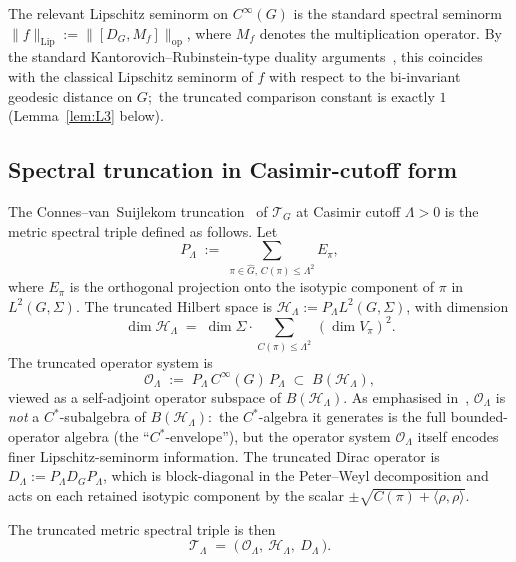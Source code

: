 \documentclass[11pt,a4paper]{article}
\theoremstyle{plain}
\theoremstyle{definition}
\newcommand{\Lammax}{\Lambda}
\newcommand{\Hilb}{\mathcal{H}}
\newcommand{\Op}{\mathcal{O}}
\newcommand{\Tcal}{\mathcal{T}}
\newcommand{\opnorm}[1]{\lVert #1 \rVert_{\mathrm{op}}}
\newcommand{\Lipnorm}[1]{\lVert #1 \rVert_{\mathrm{Lip}}}
\newcommand{\Cas}{C}
\newcommand{\Dop}{D}
\begin{document}
The relevant Lipschitz seminorm on $C^\infty(G)$ is the standard
spectral seminorm $\Lipnorm{f} := \opnorm{[\Dop_G, M_f]}$, where $M_f$
denotes the multiplication operator. By the standard
Kantorovich--Rubinstein-type duality
arguments~\cite{connes1995, latremoliere2018}, this coincides with the
classical Lipschitz seminorm of $f$ with respect to the bi-invariant
geodesic distance on $G$;\ the truncated comparison constant is
exactly $1$ (Lemma~\ref{lem:L3} below).

\subsection{Spectral truncation in Casimir-cutoff form}\label{sec:truncations}

The Connes--van~Suijlekom truncation~\cite{connes_vs2021} of $\Tcal_G$
at Casimir cutoff $\Lammax > 0$ is the metric spectral triple defined
as follows. Let
\begin{equation}\label{eq:casimir_cutoff}
   P_\Lammax \;:=\; \sum_{\pi \in \widehat G,\, \Cas(\pi) \le \Lammax^2}
   E_\pi,
\end{equation}
where $E_\pi$ is the orthogonal projection onto the isotypic component
of $\pi$ in $L^2(G, \Sigma)$. The truncated Hilbert space is
$\Hilb_\Lammax := P_\Lammax L^2(G, \Sigma)$, with dimension
\begin{equation}
   \dim \Hilb_\Lammax \;=\; \dim \Sigma \cdot
   \sum_{\Cas(\pi) \le \Lammax^2}\,(\dim V_\pi)^2.
\end{equation}
The truncated operator system is
\begin{equation}\label{eq:Op_Lammax_def}
   \Op_\Lammax \;:=\; P_\Lammax\, C^\infty(G)\, P_\Lammax
   \;\subset\; B(\Hilb_\Lammax),
\end{equation}
viewed as a self-adjoint operator subspace of $B(\Hilb_\Lammax)$. As
emphasised in~\cite[\S 1]{connes_vs2021}, $\Op_\Lammax$ is
\emph{not} a $C^*$-subalgebra of $B(\Hilb_\Lammax)$:\ the
$C^*$-algebra it generates is the full bounded-operator algebra (the
``$C^*$-envelope''), but the operator system $\Op_\Lammax$ itself
encodes finer Lipschitz-seminorm information. The truncated Dirac
operator is $\Dop_\Lammax := P_\Lammax \Dop_G P_\Lammax$, which is
block-diagonal in the Peter--Weyl decomposition and acts on each
retained isotypic component by the scalar $\pm \sqrt{\Cas(\pi) +
\langle \rho, \rho \rangle}$.

The truncated metric spectral triple is then
\begin{equation}\label{eq:Tcal_Lammax_def}
   \Tcal_\Lammax \;=\; \bigl(\, \Op_\Lammax,\ \Hilb_\Lammax,\
   \Dop_\Lammax \,\bigr).
\end{equation}
\end{document}
